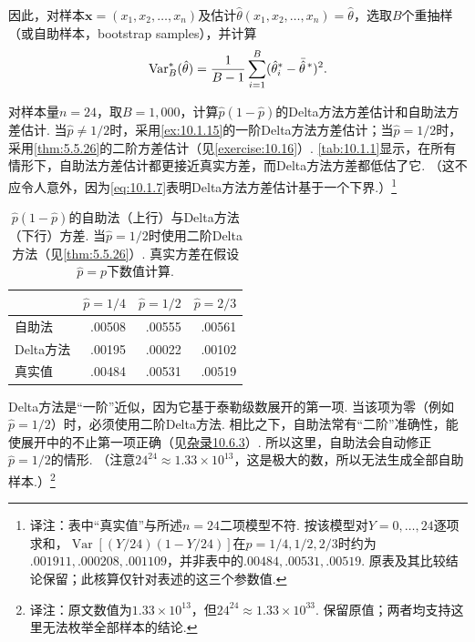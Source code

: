 因此，对样本$\boldsymbol x=(x_1,x_2,\ldots,x_n)$及估计$\hat\theta(x_1,x_2,\ldots,x_n)=\hat\theta$，选取$B$个重抽样（或自助样本，bootstrap samples），并计算
\begin{equation}\label{eq:10.1.11}\index{SI0913@重抽样}
\operatorname{Var}_B^*(\hat\theta)=\frac1{B-1}\sum_{i=1}^B(\hat\theta_i^*-\bar{\hat\theta}^{\,*})^2.
\end{equation}

\begin{example}\label{ex:10.1.21}
对样本量$n=24$，取$B=1{,}000$，计算$\hat p(1-\hat p)$的Delta方法方差估计和自助法方差估计. 当$\hat p\ne1/2$时，采用\autoref{ex:10.1.15}的一阶Delta方法方差估计；当$\hat p=1/2$时，采用\autoref{thm:5.5.26}的二阶方差估计（见\autoref{exercise:10.16}）. \autoref{tab:10.1.1}显示，在所有情形下，自助法方差估计都更接近真实方差，而Delta方法方差都低估了它. （这不应令人意外，因为\eqref{eq:10.1.7}表明Delta方法方差估计基于一个下界.）\footnote{译注：表中“真实值”与所述$n=24$二项模型不符. 按该模型对$Y=0,\ldots,24$逐项求和，$\operatorname{Var}[(Y/24)(1-Y/24)]$在$p=1/4,1/2,2/3$时约为$.001911,.000208,.001109$，并非表中的$.00484,.00531,.00519$. 原表及其比较结论保留；此核算仅针对表述的这三个参数值.}

\par\begin{table}[htbp]
\centering
\caption{$\hat p(1-\hat p)$的自助法（上行）与Delta方法（下行）方差. 当$\hat p=1/2$时使用二阶Delta方法（见\autoref{thm:5.5.26}）. 真实方差在假设$\hat p=p$下数值计算.}\label{tab:10.1.1}
\begin{tabular}{lrrr}\toprule
&$\hat p=1/4$&$\hat p=1/2$&$\hat p=2/3$\\\midrule
自助法&.00508&.00555&.00561\\
Delta方法&.00195&.00022&.00102\\\midrule
真实值&.00484&.00531&.00519\\\bottomrule
\end{tabular}
\end{table}\par

Delta方法是“一阶”近似，因为它基于泰勒级数展开的第一项. 当该项为零（例如$\hat p=1/2$）时，必须使用二阶Delta方法. 相比之下，自助法常有“二阶”准确性，能使展开中的不止第一项正确（见\hyperref[sec:10.6.3]{杂录10.6.3}）. 所以这里，自助法会自动修正$\hat p=1/2$的情形. （注意$24^{24}\approx1.33\times10^{13}$，这是极大的数，所以无法生成全部自助样本.）\footnote{译注：原文数值为$1.33\times10^{13}$，但$24^{24}\approx1.33\times10^{33}$. 保留原值；两者均支持这里无法枚举全部样本的结论.}
\end{example}

